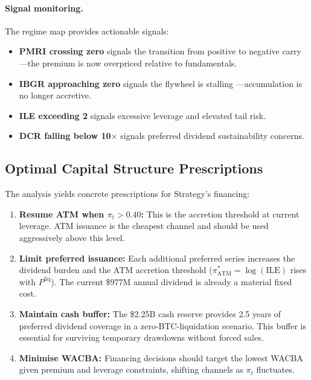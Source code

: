 \paragraph{Signal monitoring.}
The regime map provides actionable signals:
\begin{itemize}
  \item \textbf{PMRI crossing zero} signals the transition from
    positive to negative carry---the premium is now overpriced relative
    to fundamentals.
  \item \textbf{IBGR approaching zero} signals the flywheel is stalling
    ---accumulation is no longer accretive.
  \item \textbf{ILE exceeding 2} signals excessive leverage and
    elevated tail risk.
  \item \textbf{DCR falling below 10$\times$} signals preferred dividend
    sustainability concerns.
\end{itemize}

\subsection{Optimal Capital Structure Prescriptions}

The analysis yields concrete prescriptions for Strategy's financing:
\begin{enumerate}
  \item \textbf{Resume ATM when $\pi_t > 0.40$:} This is the accretion
    threshold at current leverage.  ATM issuance is the cheapest channel
    and should be used aggressively above this level.
  \item \textbf{Limit preferred issuance:} Each additional preferred
    series increases the dividend burden and the ATM accretion threshold
    ($\pi^*_{\mathrm{ATM}} = \log(\mathrm{ILE})$ rises with
    $P^{\mathrm{liq}}$).  The current \$977M annual dividend is already
    a material fixed cost.
  \item \textbf{Maintain cash buffer:} The \$2.25B cash reserve provides
    2.5 years of preferred dividend coverage in a zero-BTC-liquidation
    scenario.  This buffer is essential for surviving temporary drawdowns
    without forced sales.
  \item \textbf{Minimise WACBA:} Financing decisions should target the
    lowest WACBA given premium and leverage constraints, shifting
    channels as $\pi_t$ fluctuates.
\end{enumerate}

